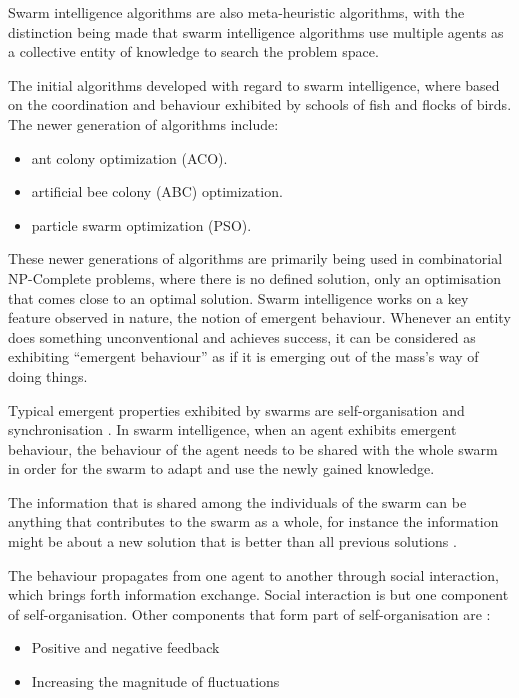 Swarm intelligence algorithms are also meta-heuristic algorithms, with the distinction being made that swarm intelligence algorithms use multiple agents as a collective entity of knowledge to search the problem space\cite{SwarmArt,ChaoticSwarmIntel,BeeJobShop,CompuIntelligenceIntro,FundamentalSwarm}.

The initial algorithms developed with regard to swarm intelligence, where based on the coordination and behaviour exhibited by schools of fish and flocks of birds. The newer generation of algorithms include\cite{SwarmArt,ChaoticSwarmIntel,BeeJobShop}:
\begin{itemize}
\item ant colony optimization (ACO)\cite{SwarmArt}.
\item artificial bee colony (ABC) optimization\cite{BeeJobShop}.
\item particle swarm optimization (PSO)\cite{ChaoticSwarmIntel}. 
\end{itemize}

These newer generations of algorithms are primarily being used in combinatorial NP-Complete problems, where there is no defined solution, only an optimisation that comes close to an optimal solution. Swarm intelligence works on a key feature observed in nature, the notion of emergent behaviour\cite{SwarmArt,CompuIntelligenceIntro,FundamentalSwarm}. Whenever an entity does something unconventional and achieves success, it can be considered as exhibiting “emergent behaviour” as if it is emerging out of the mass's way of doing things\cite{SwarmArt,CompuIntelligenceIntro,FundamentalSwarm}. 

Typical emergent properties exhibited by swarms are self-organisation and synchronisation \cite{SwarmArt}. In swarm intelligence, when an agent exhibits emergent behaviour, the behaviour of the agent needs to be shared with the whole swarm in order for the swarm to adapt and use the newly gained knowledge\cite{SwarmArt,ChaoticSwarmIntel,CompuIntelligenceIntro,FundamentalSwarm}.

The information that is shared among the individuals of the swarm can be anything that contributes to the swarm as a whole, for instance the information might be about a new solution that is better than all previous solutions \cite{SwarmArt,ChaoticSwarmIntel,CompuIntelligenceIntro,FundamentalSwarm}. 

The behaviour propagates from one agent to another through social interaction, which brings forth information exchange\cite{SwarmArt}. Social interaction is but one component of self-organisation. Other components that form part of self-organisation are \cite{SwarmArt}:
\begin{itemize}
\item Positive and negative feedback
\item Increasing the magnitude of fluctuations
\end{itemize}

